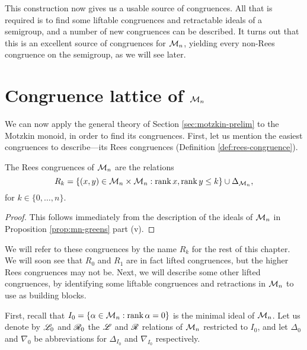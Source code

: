 This construction now gives us a usable source of congruences.  All that is
required is to find some liftable congruences and retractable ideals of a
semigroup, and a number of new congruences can be described.  It turns out that
this is an excellent source of congruences for $\mathcal{M}_n$, yielding every non-Rees
congruence on the semigroup, as we will see later.

\section{Congruence lattice of $\mathcal{M}_n$}
\label{sec:motzkin-congs}


We can now apply the general theory of Section \ref{sec:motzkin-prelim} to the
Motzkin monoid, in order to find its congruences.  First, let us mention the
easiest congruences to describe---its Rees congruences (Definition
\ref{def:rees-congruence}).

\begin{proposition}
  \label{prop:motzkin-rees}
  The Rees congruences of $\mathcal{M}_n$ are the relations
  $$R_k = \{(x,y) \in \mathcal{M}_n \times \mathcal{M}_n : \operatorname{rank} x, \operatorname{rank} y \leq k\} \cup
  \Delta_{\mathcal{M}_n},$$
  for $k \in \{0, \ldots, n\}$.
  \begin{proof}
    This follows immediately from the description of the ideals of $\mathcal{M}_n$ in
    Proposition \ref{prop:mn-greens} part (v).
  \end{proof}
\end{proposition}

We will refer to these congruences by the name $R_k$ for the rest of this
chapter.  We will soon see that $R_0$ and $R_1$ are in fact lifted congruences,
but the higher Rees congruences may not be.  Next, we will describe some other
lifted congruences, by identifying some liftable congruences and retractions in
$\mathcal{M}_n$ to use as building blocks.

First, recall that $I_0 = \{\alpha \in \mathcal{M}_n : \operatorname{rank} \alpha = 0\}$ is the
minimal ideal of $\mathcal{M}_n$.  Let us denote by $\mathrel{\mathscr{L}}_0$ and $\mathrel{\mathscr{R}}_0$ the $\mathrel{\mathscr{L}}$ and
$\mathrel{\mathscr{R}}$ relations of $\mathcal{M}_n$ restricted to $I_0$, and let $\Delta_0$ and
$\nabla_0$ be abbreviations for $\Delta_{I_0}$ and $\nabla_{I_0}$ respectively.

